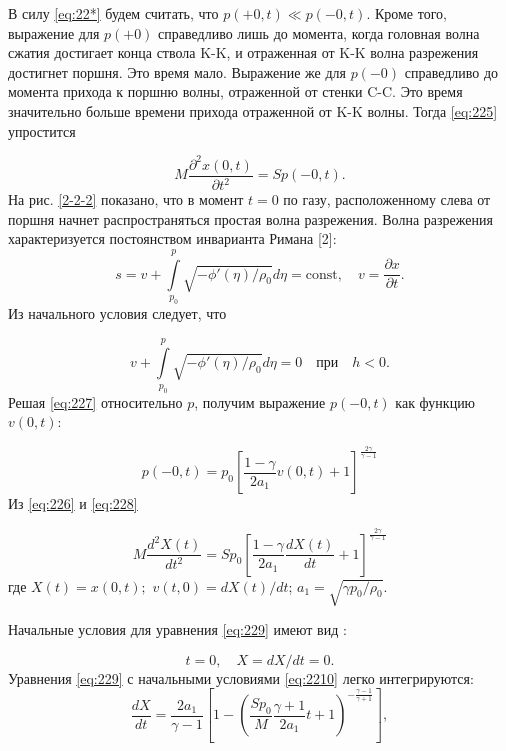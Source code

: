 \documentclass[specialist, subf, href, colorlinks=true, 14pt, final]{disser}
\theoremstyle{definition}
\newcommand{\pdfrac}[2]{\frac{\partial #1}{\partial #2}}
\newcommand{\const}{\text{const}}
\begin{document}
В силу \eqref{eq:22*} будем считать, что $p(+0,t)\ll p(-0,t)$. Кроме того, выражение для $p(+0)$ справедливо лишь до момента, когда 
головная волна сжатия достигает конца ствола K-K, и отраженная от K-K волна разрежения достигнет поршня. Это время мало. Выражение же для $p(-0)$ справедливо до момента прихода к поршню волны, отраженной от стенки C-C. Это время значительно больше времени прихода отраженной от K-K волны. Тогда \eqref{eq:225} упростится
\addtocounter{equation}{1}
\begin{equation}\label{eq:226}
  M \frac{\partial ^2 x (0,t)}{\partial t^2} = S p(-0,t)   .
  \tag{6}
\end{equation}
На рис. \ref{2-2-2} показано, что в момент $t=0$ по газу, расположенному слева от поршня начнет распространяться простая волна разрежения. Волна разрежения характеризуется постоянством инварианта Римана [2]:
\[
	s = v + \int\limits^p_{p_0} \sqrt{ - \phi '(\eta) / \rho_0} d\eta = \const, \quad v = \pdfrac{x}{t}. 
\]
Из начального условия следует, что
\addtocounter{equation}{1}
\begin{equation}\label{eq:227}
    v + \int\limits^p_{p_0} \sqrt{ - \phi '(\eta) / \rho_0} d\eta = 0 \quad \text{при} \quad h < 0 .
  \tag{7}
\end{equation}
Решая \eqref{eq:227} относительно $p$, получим выражение $p(-0,t)$ как функцию $v(0,t)$:
\addtocounter{equation}{1}
\begin{equation}\label{eq:228}
	p(-0,t) = p_0 \left[ \frac{1-\gamma}{2 a_1} v(0,t) +1 \right]^{\frac{\displaystyle 2 \gamma}{\displaystyle \gamma - 1}}
  \tag{8}
\end{equation}
Из \eqref{eq:226} и \eqref{eq:228}
\addtocounter{equation}{1}
\begin{equation}\label{eq:229}
	M \frac{d ^2 X(t)}{d t^2} = S p_{0} \left[\frac{1-\gamma}{2 a_1} \frac{d X(t)}{dt} +1 \right]^{\frac{\displaystyle 2 \gamma}{\displaystyle \gamma - 1}}
  \tag{9}
\end{equation}
где $X(t) = x(0,t);$ $ v(t,0) = dX(t)/dt$; $a_1 = \sqrt{\gamma p_0/ \rho_0}$.

Начальные условия для уравнения \eqref{eq:229} имеют вид :
\addtocounter{equation}{1}
\begin{equation}\label{eq:2210}
	t = 0, \quad X = dX / dt = 0 .
  \tag{10}
\end{equation}
Уравнения \eqref{eq:229} с начальными условиями \eqref{eq:2210} легко интегрируются:
\[
	\frac{dX}{dt} = \frac{2 a_1}{\gamma - 1} \left[ 1 - \left( \frac{Sp_0}{M} \frac{\gamma + 1}{2 a_1} t +1 \right) ^{-\frac{\displaystyle \gamma - 1}{\displaystyle \gamma +1 }} \right], 
\]
\end{document}
